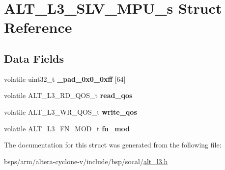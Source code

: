 \hypertarget{structALT__L3__SLV__MPU__s}{}\section{A\+L\+T\+\_\+\+L3\+\_\+\+S\+L\+V\+\_\+\+M\+P\+U\+\_\+s Struct Reference}
\label{structALT__L3__SLV__MPU__s}
\subsection*{Data Fields}
\begin{DoxyCompactItemize}
\item 
\mbox{\label{structALT__L3__SLV__MPU__s_ad9adc8dd8af7343c41c5c7ff8162d829}} 
volatile uint32\+\_\+t {\bfseries \+\_\+pad\+\_\+0x0\+\_\+0xff} \mbox{[}64\mbox{]}
\item 
\mbox{\label{structALT__L3__SLV__MPU__s_af70793862a9fec5f6c261d5b097c86f5}} 
volatile A\+L\+T\+\_\+\+L3\+\_\+\+R\+D\+\_\+\+Q\+O\+S\+\_\+t {\bfseries read\+\_\+qos}
\item 
\mbox{\label{structALT__L3__SLV__MPU__s_acb7e24ee8f3b69007e44ec0cef0ad77c}} 
volatile A\+L\+T\+\_\+\+L3\+\_\+\+W\+R\+\_\+\+Q\+O\+S\+\_\+t {\bfseries write\+\_\+qos}
\item 
\mbox{\label{structALT__L3__SLV__MPU__s_ae1fc137d7727b926aa246bb3ff08d337}} 
volatile A\+L\+T\+\_\+\+L3\+\_\+\+F\+N\+\_\+\+M\+O\+D\+\_\+t {\bfseries fn\+\_\+mod}
\end{DoxyCompactItemize}


The documentation for this struct was generated from the following file\+:\begin{DoxyCompactItemize}
\item 
bsps/arm/altera-\/cyclone-\/v/include/bsp/socal/\mbox{\hyperlink{alt__l3_8h}{alt\+\_\+l3.\+h}}\end{DoxyCompactItemize}
